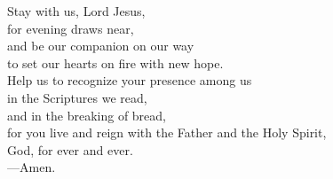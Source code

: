 \prayer


\begin{prayerverse}
Stay with us, Lord Jesus,\\
for evening draws near,\\
and be our companion on our way\\
to set our hearts on fire with new hope.\\
Help us to recognize your presence among us\\
in the Scriptures we read,\\
and in the breaking of bread,\\
for you live and reign with the Father and the Holy Spirit,\\
God, for ever and ever.\\
{\color{red}---\thinspace}Amen.
\end{prayerverse}

